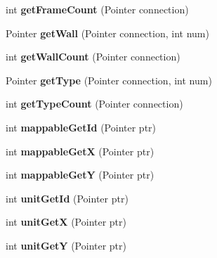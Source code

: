 \begin{DoxyCompactItemize}
\item 
\hypertarget{interfaceClient_a50002df9725186999bf89c79db54c91c}{
int {\bfseries getFrameCount} (Pointer connection)}
\label{interfaceClient_a50002df9725186999bf89c79db54c91c}

\item 
\hypertarget{interfaceClient_aa609dacf31d684b222e66f9f80016ef2}{
Pointer {\bfseries getWall} (Pointer connection, int num)}
\label{interfaceClient_aa609dacf31d684b222e66f9f80016ef2}

\item 
\hypertarget{interfaceClient_a674a2852b8e9ee3df32985287e2911e3}{
int {\bfseries getWallCount} (Pointer connection)}
\label{interfaceClient_a674a2852b8e9ee3df32985287e2911e3}

\item 
\hypertarget{interfaceClient_a869c97852a3aaaa10e34140002a4c151}{
Pointer {\bfseries getType} (Pointer connection, int num)}
\label{interfaceClient_a869c97852a3aaaa10e34140002a4c151}

\item 
\hypertarget{interfaceClient_a1189d660e0047341a32a0f836de36cb6}{
int {\bfseries getTypeCount} (Pointer connection)}
\label{interfaceClient_a1189d660e0047341a32a0f836de36cb6}

\item 
\hypertarget{interfaceClient_a1ae1d0284973ceaa5115cd3addf7ce74}{
int {\bfseries mappableGetId} (Pointer ptr)}
\label{interfaceClient_a1ae1d0284973ceaa5115cd3addf7ce74}

\item 
\hypertarget{interfaceClient_a990a88afb4867000ea14e23ac1a3d958}{
int {\bfseries mappableGetX} (Pointer ptr)}
\label{interfaceClient_a990a88afb4867000ea14e23ac1a3d958}

\item 
\hypertarget{interfaceClient_a5cdc781b1df5fd37cd3420263b7455e8}{
int {\bfseries mappableGetY} (Pointer ptr)}
\label{interfaceClient_a5cdc781b1df5fd37cd3420263b7455e8}

\item 
\hypertarget{interfaceClient_afe84b5d936352863e9819c19d0615cdb}{
int {\bfseries unitGetId} (Pointer ptr)}
\label{interfaceClient_afe84b5d936352863e9819c19d0615cdb}

\item 
\hypertarget{interfaceClient_ad7cc6b3663226ce0536074f369bd83e1}{
int {\bfseries unitGetX} (Pointer ptr)}
\label{interfaceClient_ad7cc6b3663226ce0536074f369bd83e1}

\item 
\hypertarget{interfaceClient_ab3d72c3c1a64b14245d4efbb96713626}{
int {\bfseries unitGetY} (Pointer ptr)}
\label{interfaceClient_ab3d72c3c1a64b14245d4efbb96713626}


\end{DoxyCompactItemize}
